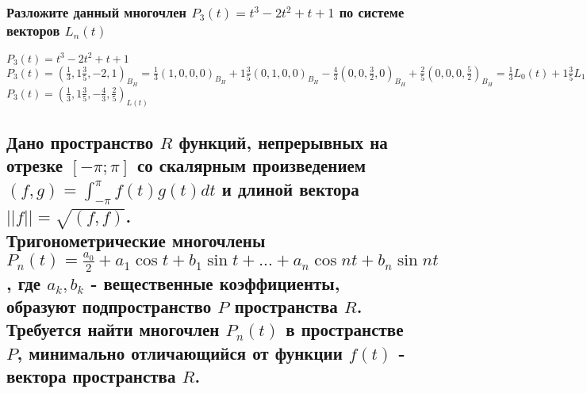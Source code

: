 \documentclass{article}
\begin{document}
    \subsubsection{Разложите данный многочлен $P_3(t) =  t^3 - 2t^2 + t + 1$ по системе векторов $L_n(t)$}
    $P_3 (t) = t^3 -2t^2 + t + 1$\\
    $P_3 (t) = (\frac{1}{3}, 1\frac{3}{5}, -2, 1)_{B_H} = \frac{1}{3}(1, 0, 0, 0)_{B_H} + 1\frac{3}{5}(0, 1, 0, 0)_{B_H} - \frac{4}{3}(0, 0, \frac{3}{2}, 0)_{B_H} + \frac{2}{5}(0, 0, 0, \frac{5}{2})_{B_H} =  \frac{1}{3}L_0(t) + 1\frac{3}{5}L_1(t) - \frac{4}{3}L_2(t) + \frac{2}{5}L_3(t)$\\
    $P_3(t) = (\frac{1}{3}, 1\frac{3}{5}, -\frac{4}{3}, \frac{2}{5})_{L(t)}$
    
    
    \subsection{Дано пространство $R$ функций, непрерывных на отрезке $[-\pi ; \pi]$ со скалярным произведением $(f, g) = \int_{-\pi}^\pi f(t)g(t) dt$ и длиной вектора $||f|| = \sqrt{(f, f)}$.\\
    Тригонометрические многочлены $P_n(t)= \frac{a_0}{2} + a_1 \cos t + b_1 \sin t + ... + a_n \cos nt + b_n \sin nt$, где $a_k, b_k$ - вещественные коэффициенты, образуют подпространство $P$ пространства $R$.\\
    Требуется найти многочлен $P_n(t)$ в пространстве $P$, минимально отличающийся от функции $f(t)$ - вектора пространства $R$.}
\end{document}
